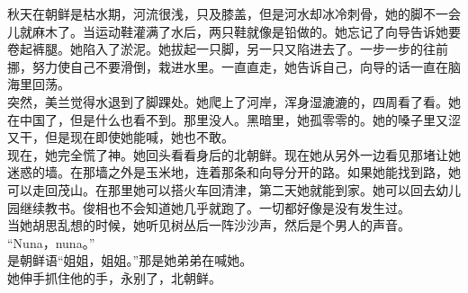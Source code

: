 秋天在朝鲜是枯水期，河流很浅，只及膝盖，但是河水却冰冷刺骨，她的脚不一会儿就麻木了。当运动鞋灌满了水后，两只鞋就像是铅做的。她忘记了向导告诉她要卷起裤腿。她陷入了淤泥。她拔起一只脚，另一只又陷进去了。一步一步的往前挪，努力使自己不要滑倒，栽进水里。一直直走，她告诉自己，向导的话一直在脑海里回荡。\\

突然，美兰觉得水退到了脚踝处。她爬上了河岸，浑身湿漉漉的，四周看了看。她在中国了，但是什么也看不到。那里没人。黑暗里，她孤零零的。她的嗓子里又涩又干，但是现在即使她能喊，她也不敢。\\

现在，她完全慌了神。她回头看看身后的北朝鲜。现在她从另外一边看见那堵让她迷惑的墙。在那墙之外是玉米地，连着那条和向导分开的路。如果她能找到路，她可以走回茂山。在那里她可以搭火车回清津，第二天她就能到家。她可以回去幼儿园继续教书。俊相也不会知道她几乎就跑了。一切都好像是没有发生过。\\

当她胡思乱想的时候，她听见树丛后一阵沙沙声，然后是个男人的声音。\\

“Nuna，nuna。”\\

是朝鲜语“姐姐，姐姐。”那是她弟弟在喊她。\\

她伸手抓住他的手，永别了，北朝鲜。\\
